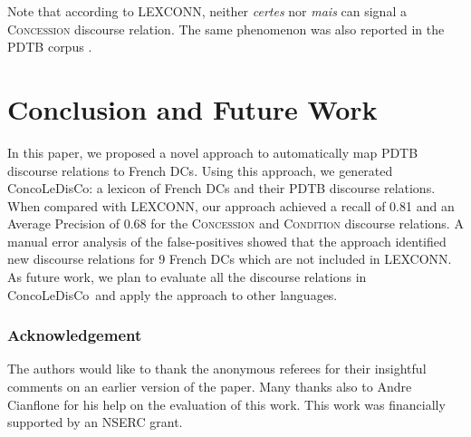 \documentclass[11pt,a4paper]{article}
\def \dict {ConcoLeDisCo}
\begin{document}
Note that according to LEXCONN, neither \textit{certes} nor \textit{mais} can signal a \textsc{Concession} discourse relation. The same phenomenon was also reported in the PDTB corpus \cite[p. 5]{prasad08-a}.

\section{Conclusion and Future Work}
\label{sec:conclusion}

In this paper, we proposed a novel approach to automatically map PDTB discourse relations to French DCs. Using this approach, we generated \dict: a lexicon of French DCs and their PDTB discourse relations. When compared with LEXCONN, our approach achieved a recall of 0.81 and an Average Precision of 0.68 for the \textsc{Concession} and \textsc{Condition} discourse relations. A manual error analysis of the false-positives showed that the approach identified new discourse relations for 9 French DCs which are not included in LEXCONN. As future work, we plan to evaluate all the discourse relations in \dict\ and apply the approach to other languages.

\subsubsection* {Acknowledgement}
The authors would like to thank the anonymous referees for their insightful
comments on an earlier version of the paper. Many thanks also to Andre Cianflone for his help on the evaluation of this work. This work was financially supported by an NSERC grant.



\end{document}
